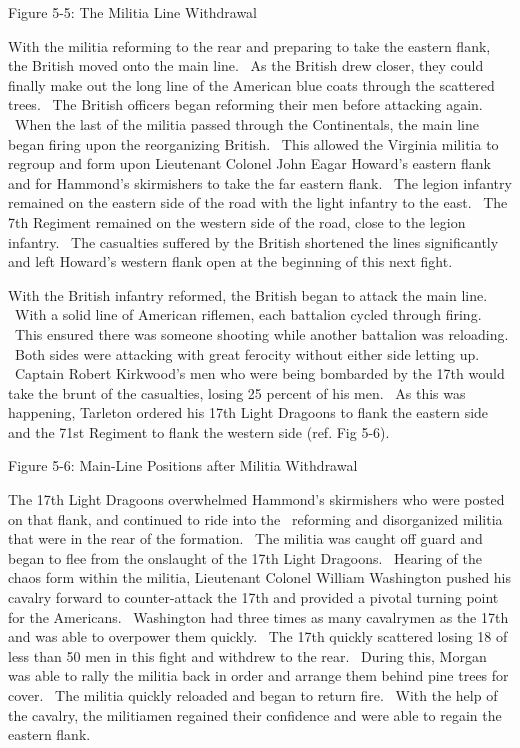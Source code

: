 Figure 5-5: The Militia Line Withdrawal \cite[p.96]{babits_devil_2001}

With the militia reforming to the rear and preparing to take the eastern flank,
the British moved onto the main line.  As the British drew closer, they could
finally make out the long line of the American blue coats through the scattered
trees.  The British officers began reforming their men before attacking again.
 When the last of the militia passed through the Continentals, the main line
began firing upon the reorganizing British.  This allowed the Virginia militia
to regroup and form upon Lieutenant Colonel John Eagar Howard’s eastern flank
and for Hammond’s skirmishers to take the far eastern flank.  The legion
infantry remained on the eastern side of the road with the light infantry to the
east.  The 7th Regiment remained on the western side of the road, close to the
legion infantry.  The casualties suffered by the British shortened the lines
significantly and left Howard’s western flank open at the beginning of this next
fight.  

With the British infantry reformed, the British began to attack the main line.
 With a solid line of American riflemen, each battalion cycled through firing.
 This ensured there was someone shooting while another battalion was reloading.
 Both sides were attacking with great ferocity without either side letting up.
 Captain Robert Kirkwood’s men who were being bombarded by the 17th would take
the brunt of the casualties, losing 25 percent of his men.  As this was
happening, Tarleton ordered his 17th Light Dragoons to flank the eastern side
and the 71st Regiment to flank the western side (ref. Fig 5-6).



Figure 5-6: Main-Line Positions after Militia Withdrawal
\cite[p.102]{babits_devil_2001}





The 17th Light Dragoons overwhelmed Hammond’s skirmishers who were posted on
that flank, and continued to ride into the  reforming and disorganized militia
that were in the rear of the formation.  The militia was caught off guard and
began to flee from the onslaught of the 17th Light Dragoons.  Hearing of the
chaos form within the militia, Lieutenant Colonel William Washington pushed his
cavalry forward to counter-attack the 17th and provided a pivotal turning point
for the Americans.  Washington had three times as many cavalrymen as the 17th
and was able to overpower them quickly.  The 17th quickly scattered losing 18 of
less than 50 men in this fight and withdrew to the rear.  During this, Morgan
was able to rally the militia back in order and arrange them behind pine trees
for cover.  The militia quickly reloaded and began to return fire.  With the
help of the cavalry, the militiamen regained their confidence and were able to
regain the eastern flank.

